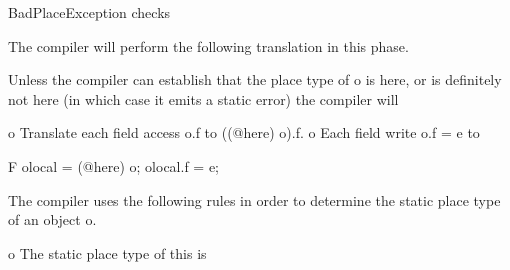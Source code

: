 BadPlaceException checks

The compiler will perform the following translation in this phase.

Unless the compiler can establish that the place type of o is here, or
is definitely not here (in which case it emits a static error) the
compiler will

o Translate each field access o.f to ((@here) o).f. 
o Each field write o.f = e to 

  F olocal = (@here) o;
  olocal.f = e;


The compiler uses the following rules in order to determine the static
place type of an object o.

o The static place type of this is 
